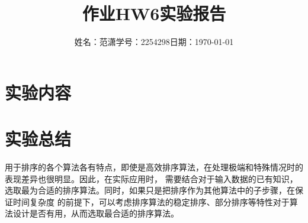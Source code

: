 \documentclass[a4paper]{article}
\title{作业{\hspace{1ex}}HW6{\hspace{1ex}}实验报告}
\author{姓名：范潇{\quad}学号：2254298{\quad}日期：\today}
\date{}
\begin{document}
\maketitle


\newpage
\section{实验内容}

\newpage

\newpage

\newpage

\newpage

\newpage
\section{实验总结}
用于排序的各个算法各有特点，即使是高效排序算法，在处理极端和特殊情况时的表现差异也很明显。因此，在实际应用时，
需要结合对于输入数据的已有知识，选取最为合适的排序算法。同时，如果只是把排序作为其他算法中的子步骤，在保证时间复杂度
的前提下，可以考虑排序算法的稳定排序、部分排序等特性对于算法设计是否有用，从而选取最合适的排序算法。
\end{document}
